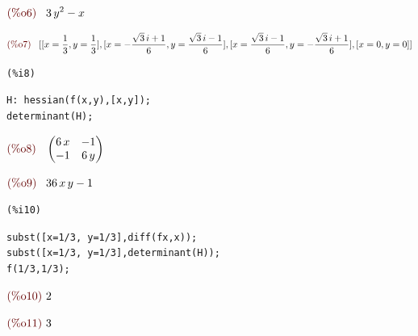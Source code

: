 \documentclass[12pt]{article}
\begin{document}
\begin{math}\displaystyle
\parbox{8ex}{\color{labelcolor}(\%o6) }
3\,{y}^{2}-x
\end{math}

\begin{math}\displaystyle
\parbox{8ex}{\color{labelcolor}(\%o7) }
[[x=\frac{1}{3},y=\frac{1}{3}],[x=-\frac{\sqrt{3}\,i+1}{6},y=\frac{\sqrt{3}\,i-1}{6}],[x=\frac{\sqrt{3}\,i-1}{6},y=-\frac{\sqrt{3}\,i+1}{6}],[x=0,y=0]]
\end{math}


\noindent
\begin{minipage}[t]{8ex}{\color{red}\bf
\begin{verbatim}
(%i8) 
\end{verbatim}}
\end{minipage}
\begin{minipage}[t]{\textwidth}{\color{blue}
\begin{verbatim}
H: hessian(f(x,y),[x,y]);
determinant(H);
\end{verbatim}}
\end{minipage}
\begin{math}\displaystyle
\parbox{8ex}{\color{labelcolor}(\%o8) }
\begin{pmatrix}6\,x & -1\cr -1 & 6\,y\end{pmatrix}
\end{math}

\begin{math}\displaystyle
\parbox{8ex}{\color{labelcolor}(\%o9) }
36\,x\,y-1
\end{math}


\noindent
\begin{minipage}[t]{8ex}{\color{red}\bf
\begin{verbatim}
(%i10) 
\end{verbatim}}
\end{minipage}
\begin{minipage}[t]{\textwidth}{\color{blue}
\begin{verbatim}
subst([x=1/3, y=1/3],diff(fx,x));
subst([x=1/3, y=1/3],determinant(H));
f(1/3,1/3);
\end{verbatim}}
\end{minipage}
\begin{math}\displaystyle
\parbox{8ex}{\color{labelcolor}(\%o10) }
2
\end{math}

\begin{math}\displaystyle
\parbox{8ex}{\color{labelcolor}(\%o11) }
3
\end{math}
\end{document}
